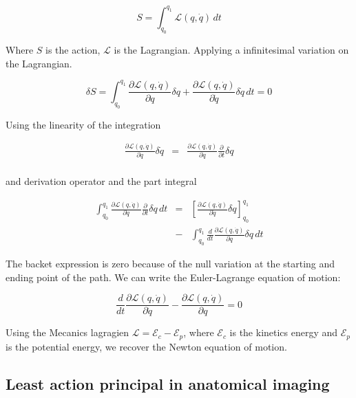 \documentclass[final, paper=letter,5p,times,twocolumn]{elsarticle}
\theoremstyle{definition}
\begin{document}
$$
S = \int_{q_{0}}^{q_{1}} \mathcal{L}(q, \dot{q}) \, dt
$$

Where $S$ is the action, $\mathcal{L}$ is the Lagrangian. Applying a infinitesimal variation on the Lagrangian.

$$
\delta S =  \int_{q_{0}}^{q_{1}} \frac{\partial\mathcal{L}(q, \dot{q})}{\partial q} \delta q + \frac{\partial\mathcal{L}(q, \dot{q})}{\partial \dot{q}} \delta \dot{q} \, dt = 0
$$

Using the linearity of the integration

\begin{eqnarray*}
    \frac{\partial\mathcal{L}(q, \dot{q})}{\partial \dot{q}} \delta \dot{q} & = & \frac{\partial\mathcal{L}(q, \dot{q})}{\partial \dot{q}} \frac{\partial }{\partial t} \delta q \\
\end{eqnarray*}


and derivation operator and the part integral

\begin{eqnarray*}
    \int_{q_{0}}^{q_{1}} \frac{\partial\mathcal{L}(q, \dot{q})}{\partial \dot{q}} \frac{\partial }{\partial t} \delta q  \, dt & = & \left \lbrack \frac{\partial\mathcal{L}(q, \dot{q})}{\partial \dot{q}} \delta q \right \rbrack_{q_{0}}^{q_{1}} \\
    & - &  \int_{q_{0}}^{q_{1}} \frac{d}{dt} \frac{\partial\mathcal{L}(q, \dot{q})}{\partial \dot{q}} \delta q \, dt
\end{eqnarray*}

The backet expression is zero because of the null variation at the starting and ending point of the path. We can write the Euler-Lagrange equation of motion:

$$
\frac{d}{dt} \frac{\partial\mathcal{L}(q, \dot{q})}{\partial \dot{q}} - \frac{\partial\mathcal{L}(q, \dot{q})}{\partial q} = 0 
\label{Euler_Lagrange}
$$

Using the Mecanics lagragien $\mathcal{L} = \mathcal{E}_{c} - \mathcal{E}_{p}$, where $\mathcal{E}_{c}$ is the kinetics energy and $\mathcal{E}_{p}$ is the potential energy, we recover the Newton equation of motion.  


\subsection{Least action principal in anatomical imaging}


\end{document}

